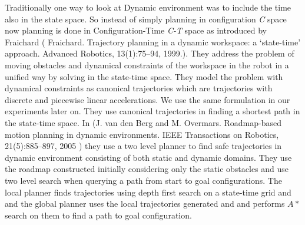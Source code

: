 \documentclass[MTech]{iitmdiss}
\begin{document}
Traditionally one way to look at Dynamic environment was to include the time also in the state space. So instead of simply planning in configuration \emph{C} space now planning is done in Configuration-Time \emph{C-T} space as introduced by Fraichard (  Fraichard. Trajectory planning in a dynamic workspace: a ‘state-time’ approach. Advanced Robotics, 13(1):75–94, 1999.). They address the problem of moving obstacles and dynamical constraints of the workspace in the robot in a unified way by solving in the state-time space. They model the problem with dynamical constraints as canonical trajectories which are trajectories with discrete and piecewise linear accelerations. We use the same formulation in our experiments later on. They use canonical trajectories in finding a shortest path in the state-time space.  In (J. van den Berg and M. Overmars. Roadmap-based motion planning in dynamic environments. IEEE Transactions on Robotics, 21(5):885–897, 2005  ) they use a two level planner to find safe trajectories in dynamic environment consisting of both static and dynamic domains. They use the roadmap constructed initially considering only the static obstacles and use two level search when querying a path from start to goal configurations. The local planner finds trajectories using depth first search on a state-time grid and and the global planner uses the local trajectories generated and and performs $A*$ search on them to find a path to goal configuration.
\end{document}
